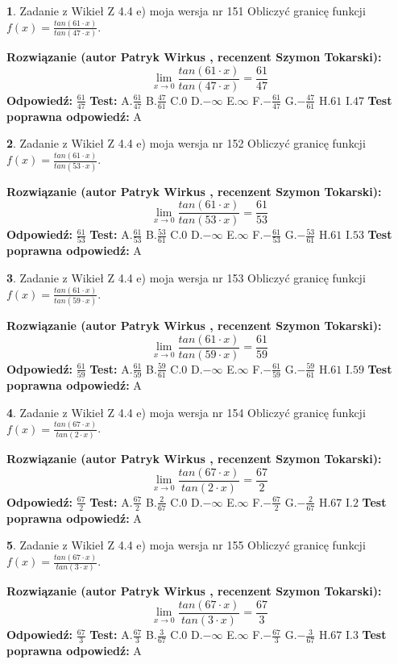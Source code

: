 \documentclass[12pt, a4paper]{article}
\theoremstyle{definition} %
\newtheorem{zad}{}
\newcommand{\zadStart}[1]{\begin{zad}#1\newline}
\newcommand{\zadStop}{\end{zad}}
\newcommand{\rozwStart}[2]{\noindent \textbf{Rozwiązanie (autor #1 , recenzent #2): }\newline}
\newcommand{\rozwStop}{\newline}
\newcommand{\odpStart}{\noindent \textbf{Odpowiedź:}\newline}
\newcommand{\odpStop}{\newline}
\newcommand{\testStart}{\noindent \textbf{Test:}\newline}
\newcommand{\testStop}{\newline}
\newcommand{\kluczStart}{\noindent \textbf{Test poprawna odpowiedź:}\newline}
\newcommand{\kluczStop}{\newline}
\begin{document}
\zadStart{Zadanie z Wikieł Z 4.4 e) moja wersja nr 151}
Obliczyć granicę funkcji $f(x)=\frac{tan(61\cdot x)}{tan(47\cdot x)}$.
\zadStop
\rozwStart{Patryk Wirkus}{Szymon Tokarski}
$$\lim\limits_{x\to 0}\frac{tan(61\cdot x)}{tan(47\cdot x)}=
\frac{61}{47}$$
\rozwStop
\odpStart
$\frac{61}{47}$
\odpStop
\testStart
A.$\frac{61}{47}$
B.$\frac{47}{61}$
C.$0$
D.$-\infty$
E.$\infty$
F.$-\frac{61}{47}$
G.$-\frac{47}{61}$
H.$61$
I.$47$
\testStop
\kluczStart
A
\kluczStop



\zadStart{Zadanie z Wikieł Z 4.4 e) moja wersja nr 152}
Obliczyć granicę funkcji $f(x)=\frac{tan(61\cdot x)}{tan(53\cdot x)}$.
\zadStop
\rozwStart{Patryk Wirkus}{Szymon Tokarski}
$$\lim\limits_{x\to 0}\frac{tan(61\cdot x)}{tan(53\cdot x)}=
\frac{61}{53}$$
\rozwStop
\odpStart
$\frac{61}{53}$
\odpStop
\testStart
A.$\frac{61}{53}$
B.$\frac{53}{61}$
C.$0$
D.$-\infty$
E.$\infty$
F.$-\frac{61}{53}$
G.$-\frac{53}{61}$
H.$61$
I.$53$
\testStop
\kluczStart
A
\kluczStop



\zadStart{Zadanie z Wikieł Z 4.4 e) moja wersja nr 153}
Obliczyć granicę funkcji $f(x)=\frac{tan(61\cdot x)}{tan(59\cdot x)}$.
\zadStop
\rozwStart{Patryk Wirkus}{Szymon Tokarski}
$$\lim\limits_{x\to 0}\frac{tan(61\cdot x)}{tan(59\cdot x)}=
\frac{61}{59}$$
\rozwStop
\odpStart
$\frac{61}{59}$
\odpStop
\testStart
A.$\frac{61}{59}$
B.$\frac{59}{61}$
C.$0$
D.$-\infty$
E.$\infty$
F.$-\frac{61}{59}$
G.$-\frac{59}{61}$
H.$61$
I.$59$
\testStop
\kluczStart
A
\kluczStop



\zadStart{Zadanie z Wikieł Z 4.4 e) moja wersja nr 154}
Obliczyć granicę funkcji $f(x)=\frac{tan(67\cdot x)}{tan(2\cdot x)}$.
\zadStop
\rozwStart{Patryk Wirkus}{Szymon Tokarski}
$$\lim\limits_{x\to 0}\frac{tan(67\cdot x)}{tan(2\cdot x)}=
\frac{67}{2}$$
\rozwStop
\odpStart
$\frac{67}{2}$
\odpStop
\testStart
A.$\frac{67}{2}$
B.$\frac{2}{67}$
C.$0$
D.$-\infty$
E.$\infty$
F.$-\frac{67}{2}$
G.$-\frac{2}{67}$
H.$67$
I.$2$
\testStop
\kluczStart
A
\kluczStop



\zadStart{Zadanie z Wikieł Z 4.4 e) moja wersja nr 155}
Obliczyć granicę funkcji $f(x)=\frac{tan(67\cdot x)}{tan(3\cdot x)}$.
\zadStop
\rozwStart{Patryk Wirkus}{Szymon Tokarski}
$$\lim\limits_{x\to 0}\frac{tan(67\cdot x)}{tan(3\cdot x)}=
\frac{67}{3}$$
\rozwStop
\odpStart
$\frac{67}{3}$
\odpStop
\testStart
A.$\frac{67}{3}$
B.$\frac{3}{67}$
C.$0$
D.$-\infty$
E.$\infty$
F.$-\frac{67}{3}$
G.$-\frac{3}{67}$
H.$67$
I.$3$
\testStop
\kluczStart
A
\kluczStop
\end{document}
